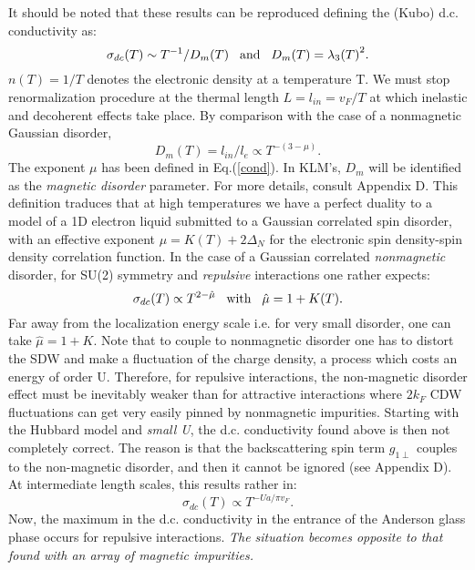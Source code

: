 It should be noted
that these results can be reproduced defining the (Kubo) 
d.c. conductivity as: 
\begin{equation}
\sigma_{dc}(T)\sim T^{-1}/D_m(T)\hskip 0.3cm \hbox{and}\hskip 0.3cm
 D_m(T)={\lambda_3(T)}^2.
\end{equation}
$n(T)=1/T$ denotes the electronic density at a temperature T. We must
stop renormalization procedure at the thermal length $L=l_{in}=v_F/T$ at which
inelastic and decoherent effects take place.
By comparison with the case of a nonmagnetic Gaussian disorder\cite{Helene}, 
\begin{equation}
D_m(T)=l_{in}/l_e\propto T^{-(3-\mu)}.
\end{equation}
The exponent $\mu$ has been defined in Eq.(\ref{cond}).
In KLM's, $D_m$ will be identified as the {\it magnetic disorder} parameter. 
For more details, consult Appendix D. This definition traduces 
that at high temperatures we have a perfect duality to a
model of a 1D electron liquid submitted to a Gaussian correlated
spin disorder, with an effective
exponent $\mu=K(T)+2\Delta_N$ for the electronic
spin density-spin density correlation function. 
In the case of a Gaussian correlated {\it nonmagnetic} disorder, for SU(2)
symmetry and {\it repulsive} interactions one rather
expects\cite{Giam2,Peschel}:
\begin{equation}
\label{dis}
\sigma_{dc}(T)\propto T^{2-\hat{\mu}}\hskip 0.3cm \hbox{with}\hskip 0.3cm 
\hat{\mu}=1+K(T).
\end{equation}
Far away from the localization energy scale
i.e. for very small disorder, one can take $\hat{\mu}=1+K$\cite{Apel}.
\vskip 0.15cm
Note that to couple to nonmagnetic disorder
one has to distort the SDW and make a fluctuation of the charge
density, a process
which costs an energy of order U. 
Therefore, for repulsive interactions, 
the non-magnetic disorder effect must be 
inevitably weaker than for attractive interactions where
$2k_F$ CDW fluctuations can get very easily pinned
by nonmagnetic impurities. Starting with the Hubbard model
and \emph{small U}, the 
d.c. conductivity found above is then not completely correct. The
reason is that the backscattering spin
term $g_{1\perp}$ couples to the non-magnetic disorder, and
then it cannot be ignored (see Appendix D). At intermediate length scales, 
this results rather in:
\begin{equation}
\label{conductivity_nm}
\sigma_{dc}(T)\propto T^{-Ua/\pi v_F}.
\end{equation}
Now, the maximum in the d.c. conductivity
in the entrance of the Anderson glass phase occurs 
for repulsive interactions.
{\it The situation becomes opposite to that found 
with an array of magnetic impurities.}

